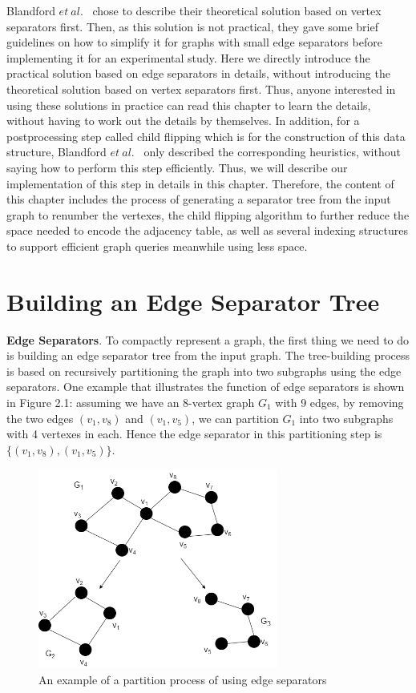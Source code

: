 \documentclass[12pt,glossary]{dalthesis}
\begin{document}
Blandford $et \ al.$~\cite{compact-representation} chose to describe their theoretical solution based on vertex separators first. Then, as this solution is not practical, they gave some brief guidelines on how to simplify it for graphs with small edge separators before implementing it for an experimental study. Here we directly introduce the practical solution based on edge separators in details, without introducing the theoretical solution based on vertex separators first. Thus, anyone interested in using these solutions in practice can read this chapter to learn the details, without having to work out the details by themselves. In addition, for a postprocessing step called child flipping which is for the construction of this data structure, Blandford $et \ al.$~\cite{compact-representation} only described the corresponding heuristics, without saying how to perform this step efficiently. Thus, we will describe our implementation of this step in details in this chapter. Therefore, the content of this chapter includes the process of generating a separator tree from the input graph to renumber the vertexes, the child flipping  algorithm to further reduce the space needed to encode the adjacency table, as well as several indexing structures to support efficient graph queries meanwhile using less space.    


\section{Building an Edge Separator Tree}

\textbf{Edge Separators}. To compactly represent a graph, the first thing we need to do is building an edge separator tree from the input graph. The tree-building process is based on recursively partitioning the graph into two subgraphs using the edge separators. One example that illustrates the function of edge separators is shown in Figure 2.1: assuming we have an 8-vertex graph $G_{1}$ with 9 edges, by removing the two edges $(v_{1}, v_{8})$ and $(v_{1}, v_{5})$, we can partition $G_{1}$ into two subgraphs with 4 vertexes in each. Hence the edge separator in this partitioning step is $\{(v_{1}, v_{8}),(v_{1}, v_{5}) \}$.

\bigskip

\begin{figure}[ht]
\centering
\includegraphics[width=0.7\textwidth]{partition}
\caption{An example of a partition process of using edge separators}
\end{figure}
\end{document}
